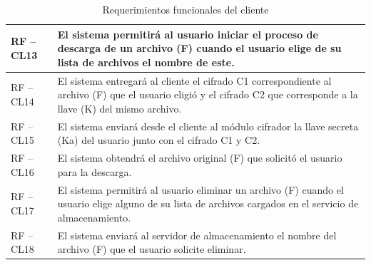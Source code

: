 \begin{table}[htb]
\begin{tabular}{| p{2cm} |  p{13.5cm} |}
RF – CL13 & El sistema permitirá al usuario iniciar el proceso de descarga de un archivo (F) cuando el usuario elige de su lista de archivos el nombre de este. \\ \hline
RF – CL14 & El sistema entregará al cliente el cifrado C1 correspondiente al archivo (F) que el usuario eligió y el cifrado C2 que corresponde a la llave (K) del mismo archivo. \\ \hline
RF – CL15 & El sistema enviará desde el cliente al módulo cifrador la llave secreta (Ka) del usuario junto con el cifrado C1 y C2.  \\ \hline
RF – CL16 & El sistema obtendrá el archivo original (F) que solicitó el usuario para la descarga.  \\ \hline
RF – CL17 & El sistema permitirá al usuario eliminar un archivo (F) cuando el usuario elige alguno de su lista de archivos cargados en el servicio de almacenamiento.  \\ \hline
RF – CL18 & El sistema enviará al servidor de almacenamiento el nombre del archivo (F) que el usuario solicite eliminar.  \\ \hline
\end{tabular}
\caption{Requerimientos funcionales del cliente}
\label{Cliente }
\end{table}


